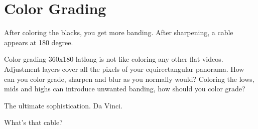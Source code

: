 \chapter{Color Grading}
\pagecolor{white}
\label{chap:54}
\begin{fullwidth}

\problem

{\large After coloring the blacks, you get more banding. After sharpening, a cable appears at 180 degree. \par}

Color grading 360x180 latlong is not like coloring any other flat videos. Adjustment layers cover all the pixels of your equirectangular panorama. How can you color grade, sharpen and blur as you normally would? Coloring the lows, mids and highs can introduce unwanted banding, how should you color grade?

\solution

{\large The ultimate sophistication. Da Vinci. \par}



{\large What's that cable? \par}



\end{fullwidth}